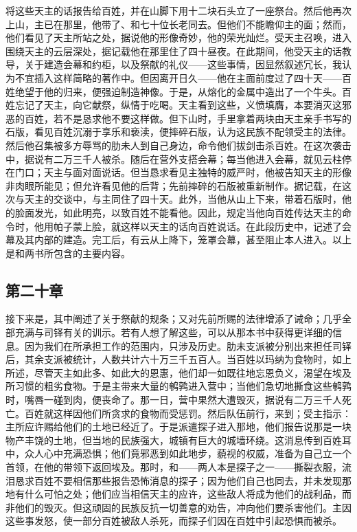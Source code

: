 将这些天主的话报告给百姓，并在山脚下用十二块石头立了一座祭台。然后他再次上山，主已在那里，他带了、和七十位长老同去。但他们不能瞻仰主的面；然而，他们看见了天主所站之处，据说他的形像奇妙，他的荣光灿烂。受天主召唤，进入围绕天主的云层深处，据记载他在那里住了四十昼夜。在此期间，他受天主的话教导，关于建造会幕和约柜，以及祭献的礼仪——这些事情，因显然叙述冗长，我认为不宜插入这样简略的著作中。但因离开日久——他在主面前度过了四十天——百姓绝望于他的归来，便强迫制造神像。于是，从熔化的金属中造出了一个牛头。百姓忘记了天主，向它献祭，纵情于吃喝。天主看到这些，义愤填膺，本要消灭这邪恶的百姓，若不是恳求他不要这样做。但下山时，手里拿着两块由天主亲手书写的石版，看见百姓沉溺于享乐和亵渎，便摔碎石版，认为这民族不配领受主的法律。然后他召集被多方辱骂的肋未人到自己身边，命令他们拔剑击杀百姓。在这次袭击中，据说有二万三千人被杀。随后在营外支搭会幕；每当他进入会幕，就见云柱停在门口；天主与面对面说话。但当恳求看见主独特的威严时，他被告知天主的形像非肉眼所能见；但允许看见他的后背；先前摔碎的石版被重新制作。据记载，在这次与天主的交谈中，与主同住了四十天。此外，当他从山上下来，带着石版时，他的脸面发光，如此明亮，以致百姓不能看他。因此，规定当他向百姓传达天主的命令时，他用帕子蒙上脸，就这样以天主的话向百姓说话。在此段历史中，记述了会幕及其内部的建造。完工后，有云从上降下，笼罩会幕，甚至阻止本人进入。以上是和两书所包含的主要内容。\par


\subsection{第二十章}

接下来是，其中阐述了关于祭献的规条；又对先前所赐的法律增添了诫命；几乎全部充满与司铎有关的训示。若有人想了解这些，可以从那本书中获得更详细的信息。因为我们在所承担工作的范围内，只涉及历史。肋未支派被分别出来担任司铎后，其余支派被统计，人数共计六十万三千五百人。当百姓以玛纳为食物时，如上所述，尽管天主如此多、如此大的恩惠，他们却一如既往地忘恩负义，渴望在埃及所习惯的粗劣食物。于是主带来大量的鹌鹑进入营中；当他们急切地撕食这些鹌鹑时，嘴唇一碰到肉，便丧命了。那一日，营中果然大遭毁灭，据说有二万三千人死亡。百姓就这样因他们所贪求的食物而受惩罚。然后队伍前行，来到；受主指示：主所应许赐给他们的土地已经近了。于是派遣探子进入那地，他们报告说那是一块物产丰饶的土地，但当地的民族强大，城镇有巨大的城墙环绕。这消息传到百姓耳中，众人心中充满恐惧；他们竟邪恶到如此地步，藐视的权威，准备为自己立一个首领，在他的带领下返回埃及。那时，和——两人本是探子之一——撕裂衣服，流泪恳求百姓不要相信那些报告恐怖消息的探子；因为他们自己也同去，并未发现那地有什么可怕之处；他们应当相信天主的应许，这些敌人将成为他们的战利品，而非他们的毁灭。但这顽固的民族反抗一切善意的劝告，冲向他们要杀害他们。主因这些事发怒，使一部分百姓被敌人杀死，而探子们因在百姓中引起恐惧而被杀。\par

